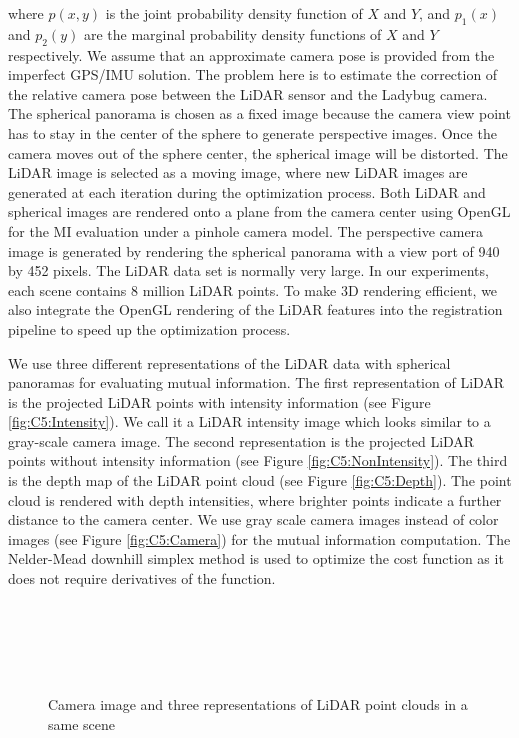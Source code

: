 where $p(x, y)$ is the joint probability density function of $X$ and $Y$, and $p_1(x)$ and $p_2(y)$ are the marginal probability density functions of $X$ and $Y$ respectively. We assume that an approximate camera pose is provided from the imperfect GPS/IMU solution. The problem here is to estimate the correction of the relative camera pose between the LiDAR sensor and the Ladybug camera.  The spherical panorama is chosen as a fixed image because the camera view point has to stay in the center of the sphere to generate perspective images. Once the camera moves out of the sphere center, the spherical image will be distorted.
The LiDAR image is selected as a moving image, where new LiDAR images are generated at each iteration during the optimization process. Both LiDAR and spherical images are rendered onto a plane from the camera center using OpenGL for the MI evaluation under a pinhole camera model. The perspective camera image is generated by  rendering the spherical panorama with a view port of 940 by 452 pixels. The LiDAR data set is normally very large. In our experiments, each scene contains 8 million LiDAR points. To make 3D rendering efficient, we also integrate the OpenGL rendering of the LiDAR features into the registration pipeline to speed up the optimization process.  

We use three different representations of the LiDAR data with spherical panoramas for evaluating mutual information. The first representation of LiDAR is the projected LiDAR points with intensity information (see Figure \ref{fig:C5:Intensity}). We call it a LiDAR intensity image which looks similar to a gray-scale camera image. The second representation is the projected LiDAR points without intensity information (see Figure \ref{fig:C5:NonIntensity}). The third is the depth map of the LiDAR point cloud (see Figure \ref{fig:C5:Depth}). The point cloud is rendered with depth intensities, where brighter points indicate a further distance to the camera center. We use gray scale camera images instead of color images (see  Figure \ref{fig:C5:Camera}) for the mutual information computation. The Nelder-Mead downhill simplex method \cite{NelderMead65} is used to optimize the cost function as it does not require derivatives of the function.  

\begin{figure}[H]
\centering
{} \\
\\
 \\
 \\
\caption{Camera image and three representations of LiDAR point clouds in a same scene } 
\label{fig:C5:LiDARFeatures}
\end{figure}

